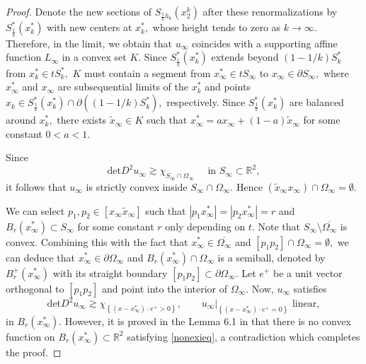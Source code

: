 \documentclass[11pt]{amsart}
\theoremstyle{plain}
\renewcommand{\det}{\mbox{det}}
\newcommand{\0}{\textbf{0}}
\numberwithin{equation}{section}
\numberwithin{equation}{section}
\numberwithin{figure}{section}
\begin{document}
\begin{proof}
		
		Denote the new sections of $S_{\frac{1}{k} h_k}\left(x_2^k\right)$ after these renormalizations by $S^*_{\frac{1}{k}}(x^*_k)$ with new centers at $x^*_k,$ whose height tends to zero as $k\rightarrow \infty.$ Therefore, in the limit, we obtain that $u_{\infty}$ coincides with a 
		supporting affine function $L_{\infty}$ in a convex set $K.$ Since $S^*_{\frac{1}{k}}(x^*_k)$ extends beyond $(1-1/k)S_k^*$ from $x^*_k\in tS_k^*,$ $K$ must contain a segment from $x^*_{\infty}\in t S_{\infty}$ to $x_{\infty}\in \partial S_{\infty},$ where $x^*_{\infty}$ and $x_{\infty}$ are subsequential limits of the $x^*_k$ and points $x_k\in S^*_{\frac{1}{k}}(x^*_k)\cap \partial \left((1-1/k)S_k^*\right),$ respectively. Since $S^*_{\frac{1}{k}}(x^*_k)$ are balanced around $x^*_k,$ there exists $\tilde{x}_{\infty}\in K$ such that $x^*_{\infty}=ax_{\infty}+(1-a)\tilde{x}_{\infty}$ for  some constant $0<a<1.$
		
		Since
		\begin{equation}\label{uinfeq}
			\det D^2 u_{\infty}\gtrsim \chi_{S_{\infty}\cap \Omega_{\infty}}\quad \text{ in }S_{\infty}\subset \mathbb{R}^2,
		\end{equation} 
		it follows that $u_{\infty}$ is strictly convex inside $S_{\infty}\cap \Omega_{\infty}.$
		Hence $(\tilde{x}_{\infty}x_{\infty})\cap \Omega_\infty=\emptyset.$
		
		We can select $p_1,p_2\in [x_{\infty}\tilde{x}_{\infty}]$ such that $|p_1x^*_{\infty}|=|p_2x^*_{\infty}|=r$ and $B_r(x^*_{\infty})\subset S_{\infty}$ for some constant $r$ only depending on $t.$ Note that $S_{\infty}\setminus \overline{\Omega_{\infty}}$ is convex. Combining this with the fact that $x^*_{\infty}\in \overline{\Omega_{\infty}}$ and $[p_1p_2]\cap \Omega_{\infty}=\emptyset,$ we can deduce that $x^*_{\infty}\in \partial \Omega_{\infty}$ and $B_r(x^*_{\infty})\cap \Omega_{\infty}$ is a semiball, denoted by $B^+_r(x^*_{\infty})$ with its straight boundary $[p_1p_2]\subset \partial \Omega_{\infty}.$ 
		Let $e^+$ be a unit vector orthogonal to $[p_1p_2]$ and point into the interior of  $\Omega_{\infty}.$
		Now, $u_{\infty}$  satisfies
		\begin{equation}\label{nonexieq}
			\det D^2 u_{\infty}\gtrsim \chi_{\left\{(x-x^*_{\infty})\cdot e^+>0\right\}} ,\qquad u_{\infty}|_{\left\{(x-x^*_{\infty})\cdot e^+=0\right\}}\text{ linear},
		\end{equation}
		in $B_r(x^*_{\infty}).$
		However, it is proved in the Lemma 6.1 in \cite{CR} that there is no convex function on $B_r(x^*_{\infty})\subset \mathbb{R}^2$ satisfying \eqref{nonexieq}, a contradiction which completes the proof.
	\end{proof}
\end{document}
